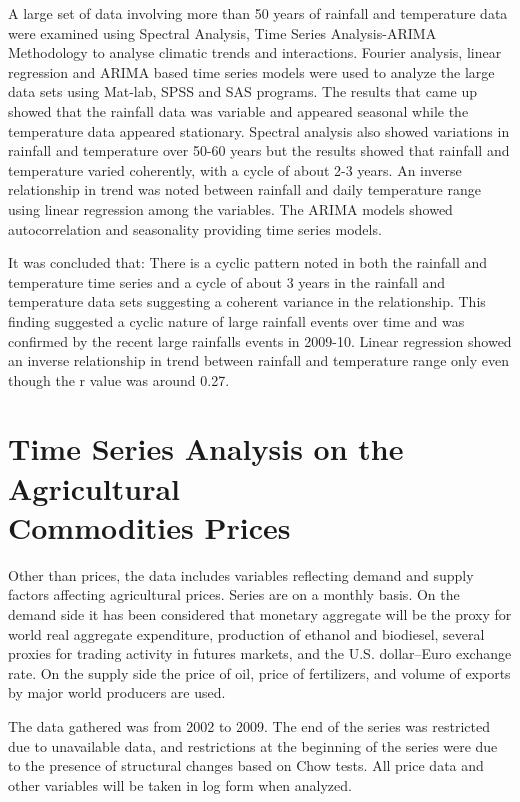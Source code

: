 A large set of data involving more than 50 years of rainfall and temperature data were examined using Spectral Analysis, Time Series Analysis-ARIMA Methodology to analyse climatic trends and interactions. Fourier analysis, linear regression and ARIMA based time series models were used to analyze the large data sets using Mat-lab, SPSS and SAS programs. The results that came up showed that the rainfall data was variable and appeared seasonal while the temperature data appeared stationary. Spectral analysis also showed variations in rainfall and temperature over 50-60 years but the results showed that rainfall and temperature varied coherently, with a cycle of about 2-3 years. An inverse relationship in trend was noted between rainfall and daily temperature range using linear regression among the variables. The ARIMA models showed autocorrelation and seasonality providing time series models.

It was concluded that: There is a cyclic pattern noted in both the rainfall and temperature time series and a cycle of about 3 years in the rainfall and temperature data sets suggesting a coherent variance in the relationship. This finding suggested a cyclic nature of large rainfall events over time and was confirmed by the recent large rainfalls events in 2009-10. Linear regression showed an inverse relationship in trend between rainfall and temperature range only even though the r value was around 0.27. 

\section*{Time Series Analysis on the Agricultural\\ Commodities Prices}

Other than prices, the data includes variables reflecting demand and supply factors affecting agricultural prices. Series are on a monthly basis. On the demand side it has been considered that monetary aggregate will be the proxy for world real aggregate expenditure, production of ethanol and biodiesel, several proxies for trading activity in futures markets, and the U.S. dollar–Euro exchange rate. On the supply side the price of oil, price of fertilizers, and volume of exports by major world producers are used. 

The data gathered was from 2002 to 2009. The end of the series was restricted due to unavailable data, and restrictions at the beginning of the series were due to the presence of structural changes based on Chow tests. All price data and other variables will be taken in log form when analyzed.

